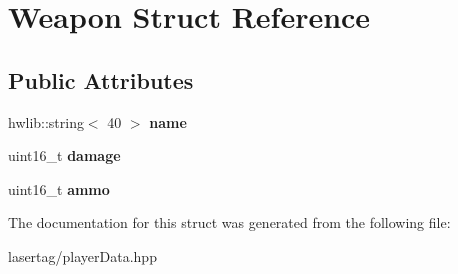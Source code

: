 \hypertarget{struct_weapon}{}\section{Weapon Struct Reference}
\label{struct_weapon}
\subsection*{Public Attributes}
\begin{DoxyCompactItemize}
\item 
\mbox{\label{struct_weapon_a536ea9386102f7c456cee4a0b48a916b}} 
hwlib\+::string$<$ 40 $>$ {\bfseries name}
\item 
\mbox{\label{struct_weapon_a66aef70c814827a6da3546d4ec754db2}} 
uint16\+\_\+t {\bfseries damage}
\item 
\mbox{\label{struct_weapon_a92136baff764c07f24bfac06706a3dc1}} 
uint16\+\_\+t {\bfseries ammo}
\end{DoxyCompactItemize}


The documentation for this struct was generated from the following file\+:\begin{DoxyCompactItemize}
\item 
lasertag/player\+Data.\+hpp\end{DoxyCompactItemize}
